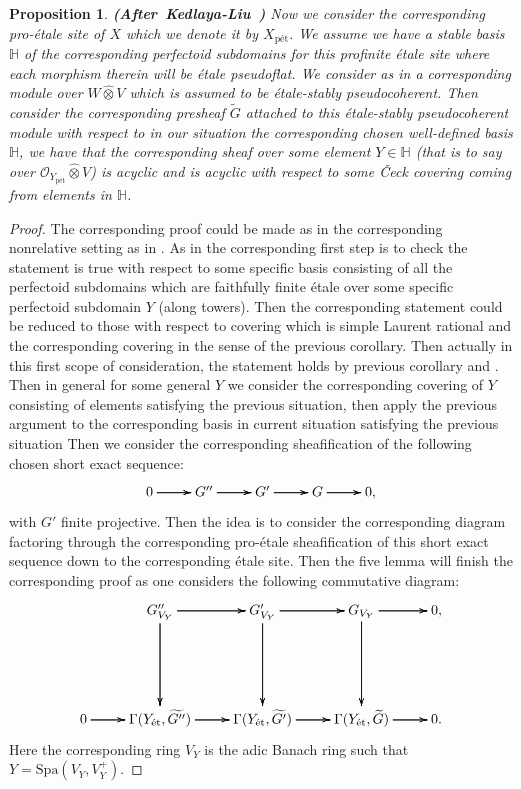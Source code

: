 \documentclass[12pt]{amsart}
\newtheorem{proposition}[theorem]{Proposition}
\theoremstyle{definition}
\numberwithin{equation}{section}
\begin{document}
\begin{proposition}\mbox{\bf{(After Kedlaya-Liu \cite[Theorem 3.4.6]{KL2})}} \label{proposition2.7} 
Now we consider the corresponding pro-\'etale site of $X$ which we denote it by $X_\text{p\'et}$. We assume we have a stable basis $\mathbb{H}$ of the corresponding perfectoid subdomains for this profinite \'etale site where each morphism therein will be \'etale pseudoflat. We consider as in \cite[Theorem 3.4.6]{KL2} a corresponding module over $W\widehat{\otimes}V$ which is assumed to be \'etale-stably pseudocoherent. Then consider the corresponding presheaf $\widetilde{G}$ attached to this \'etale-stably pseudocoherent module with respect to in our situation the corresponding chosen well-defined basis $\mathbb{H}$, we have that the corresponding sheaf over some element $Y\in \mathbb{H}$ (that is to say over $\mathcal{O}_{Y_\text{p\'et}}\widehat{\otimes}V$) is acyclic and is acyclic with respect to some \v{C}eck covering coming from elements in $\mathbb{H}$. 
\end{proposition}


\begin{proof}
The corresponding proof could be made as in the corresponding nonrelative setting as in \cite[Theorem 3.4.6]{KL2}. As in \cite[Theorem 3.4.6]{KL2} the corresponding first step is to check the statement is true with respect to some specific basis consisting of all the perfectoid subdomains which are faithfully finite \'etale over some specific perfectoid subdomain $Y$ (along towers). Then the corresponding statement could be reduced to those with respect to covering which is simple Laurent rational and the corresponding covering in the sense of the previous corollary. Then actually in this first scope of consideration, the statement holds by previous corollary and \cite[Theorem 2.12]{TX2}. Then in general for some general $Y$ we consider the corresponding covering of $Y$ consisting of elements satisfying the previous situation, then apply the previous argument to the corresponding basis in current situation satisfying the previous situation Then we consider the corresponding sheafification of the following chosen short exact sequence:
\[
\xymatrix@C+0pc@R+0pc{
0 \ar[r] \ar[r] \ar[r] &G'' \ar[r] \ar[r] \ar[r] &G'  \ar[r] \ar[r] \ar[r] &G \ar[r] \ar[r] \ar[r] &0 ,   
}
\]
with $G'$ finite projective. Then the idea is to consider the corresponding diagram factoring through the corresponding pro-\'etale sheafification of this short exact sequence down to the corresponding \'etale site. Then the five lemma will finish the corresponding proof as one considers the following commutative diagram:
\[
\xymatrix@C+0pc@R+3pc{
&G''_{V_Y} \ar[r] \ar[r] \ar[r] \ar[d] \ar[d] \ar[d] &G'_{V_Y}  \ar[r] \ar[r] \ar[r] \ar[d] \ar[d] \ar[d] &G_{V_Y} \ar[r] \ar[r] \ar[r] \ar[d] \ar[d] \ar[d] &0 ,  \\
0 \ar[r] \ar[r] \ar[r] &\Gamma(Y_\text{\'et},\widetilde{G''}) \ar[r] \ar[r] \ar[r] &\Gamma(Y_\text{\'et},\widetilde{G'})  \ar[r] \ar[r] \ar[r] &\Gamma(Y_\text{\'et},\widetilde{G}) \ar[r] \ar[r] \ar[r] &0.  \\ 
}
\]
Here the corresponding ring $V_Y$ is the adic Banach ring such that $Y=\mathrm{Spa}(V_Y,V_Y^+)$.
\end{proof}
\end{document}
